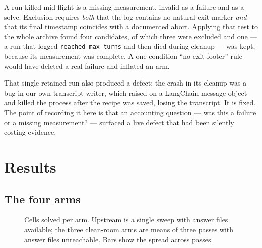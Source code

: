 \documentclass[11pt,a4paper]{article}
\begin{document}
A run killed mid-flight is a missing measurement, invalid as a failure and as a
solve. Exclusion requires \emph{both} that the log contains no natural-exit
marker \emph{and} that its final timestamp coincides with a documented abort.
Applying that test to the whole archive found four candidates, of which three
were excluded and one --- a run that logged \texttt{reached max\_turns} and then
died during cleanup --- was kept, because its measurement was complete. A
one-condition ``no exit footer'' rule would have deleted a real failure and
inflated an arm.

That single retained run also produced a defect: the crash in its cleanup was a
bug in our own transcript writer, which raised on a LangChain message object and
killed the process after the recipe was saved, losing the transcript. It is
fixed. The point of recording it here is that an accounting question --- was
this a failure or a missing measurement? --- surfaced a live defect that had
been silently costing evidence.

\section{Results}

\subsection{The four arms}

\begin{figure}[htbp]
\centering
{}
\caption{Cells solved per arm. Upstream is a single sweep with answer files
available; the three clean-room arms are means of three passes with answer files
unreachable. Bars show the spread across passes.}
\end{figure}
\end{document}
